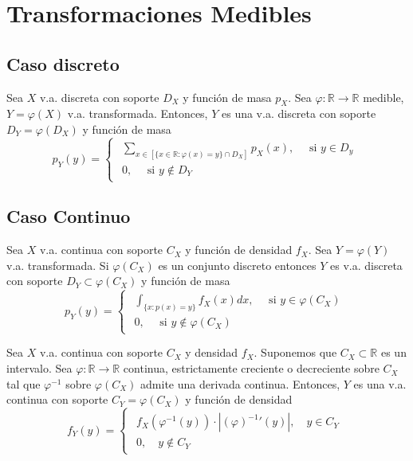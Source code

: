 \section{Transformaciones Medibles}

\subsection{Caso discreto}

\begin{theo}
  Sea $X$ v.a. discreta con soporte $D_{X}$ y función de masa $p_{X}$. Sea $\varphi :  \mathbb{R} \to \mathbb{R}$ medible, $Y = \varphi(X)$ v.a. transformada. Entonces, $Y$ es una v.a. discreta con soporte $D_{Y} = \varphi(D_{X})$ y función de masa
  \[ 
    p_{Y}(y)  =
    \begin{cases}
      \begin{aligned}
        \sum_{x \in [\{ x \in \mathbb{R} : \varphi(x) = y \} \cap D_{X}]} p_{X}(x), \quad \text{ si } y \in D_{y} \\
      0, \quad \text{ si } y \not \in D_{Y}
      \end{aligned}
    \end{cases} 
  \] 
\end{theo}

\subsection{Caso Continuo}

\begin{theo}
  Sea $X$ v.a. continua con soporte $C_{X}$ y función de densidad $f_{X}$. Sea $Y = \varphi(Y)$ v.a. transformada. Si $\varphi(C_{X})$ es un conjunto discreto entonces $Y$ es v.a. discreta con soporte $D_{Y} \subset \varphi(C_{X})$ y función de masa
  \[ 
    p_{Y}(y)  =
    \begin{cases}
      \begin{aligned}
        \int_{\{ x : p(x) = y \}}^{} f_{X}(x) dx, \quad \text{ si } y \in \varphi(C_{X}) \\
        0, \quad \text{ si } y \not \in \varphi(C_{X})
      \end{aligned}
    \end{cases} 
  \] 
\end{theo}

\begin{theo}
  Sea $X$ v.a. continua con soporte $C_{X}$ y densidad $f_{X}$. Suponemos que $ C_{X} \subset \mathbb{R}$ es un intervalo. Sea $\varphi :  \mathbb{R} \to \mathbb{R}$ continua, estrictamente creciente o decreciente sobre $C_{X}$ tal que $\varphi^{-1}$ sobre $\varphi(C_{X})$ admite una derivada continua. Entonces, $Y$ es una v.a. continua con soporte $C_{Y} = \varphi(C_{X})$ y función de densidad
  \[ 
    f_{Y}(y) = 
    \begin{cases}
      \begin{aligned}
        f_{X}(\varphi^{-1}(y)) \cdot | (\varphi)^{-1}'(y) |, \quad y \in C_{Y} \\
        0, \quad y \not \in C_{Y}
      \end{aligned}
    \end{cases} 
  \] 
\end{theo}

